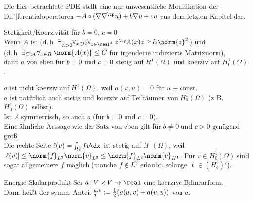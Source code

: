 \begin{Bem}
    Die hier betrachtete PDE stellt eine nur unwesentliche Modifikation der
    Dif"|ferentialoperatoren $-A \circ (\nabla \nabla^\tp u) + b \nabla u + cu$
    aus dem letzten Kapitel dar.
\end{Bem}

\linie

\begin{Satz}{Stetigkeit/Koerzivität für $b = 0$, $c = 0$}\\
    Wenn $A$
     ist
    (d.\,h. $\exists_{\widetilde{\alpha} > 0} \forall_{x \in \Omega} \forall_{z \in \real^d}\;
    z^\tp A(x) z \ge \widetilde{\alpha} \norm{z}^2$) und\\
    (d.\,h. $\exists_{C > 0} \forall_{x \in \Omega}\; \norm{A(x)} \le C$ für irgendeine
    induzierte Matrixnorm),\\
    dann $a$ von eben für $b = 0$ und $c = 0$
    stetig auf $H^1(\Omega)$ und koerziv auf $H^1_0(\Omega)$.
\end{Satz}

\begin{Bem}
    $a$ ist nicht koerziv auf $H^1(\Omega)$,
    weil $a(u, u) = 0$ für $u \equiv \text{const}$.\\
    $a$ ist natürlich auch stetig und koerziv auf Teilräumen von $H^1_0(\Omega)$
    (z.\,B. $H^1_0(\Omega)$ selbst).\\
    Ist $A$ symmetrisch, so auch $a$ (für $b = 0$ und $c = 0$).\\
    Eine ähnliche Aussage wie der Satz von eben gilt für $b \not= 0$ und $c > 0$ genügend groß.\\
    Die rechte Seite $\ell(v) = \int_\Omega fv \dx$ ist stetig auf $H^1(\Omega)$,
    weil $|\ell(v)| \le \norm{f}_{L^2} \norm{v}_{L^2} \le \norm{f}_{L^2} \norm{v}_{H^1}$.
    Für $v \in H^1_0(\Omega)$ sind sogar allgemeinere $f$ möglich
    (manche $f \notin L^2$ erlaubt, solange $\ell \in (H^1_0)'$).
\end{Bem}

\linie

\begin{Def}{Energie-Skalarprodukt}
    Sei $a\colon V \times V \to \real$ eine koerzive Bilinearform.\\
    Dann heißt der symm. Anteil $\sp{u, v}_a := \frac{1}{2} (a(u,v) + a(v,u))$
     von $a$.
\end{Def}

